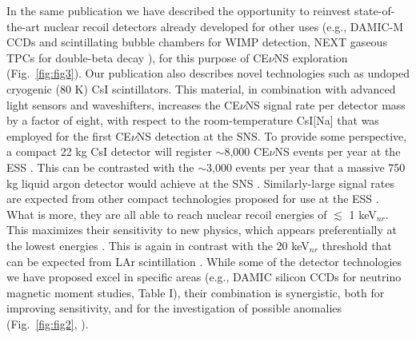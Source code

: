 \documentclass[12pt]{article}
\begin{document}
In the same publication we have described the opportunity to reinvest state-of-the-art nuclear recoil detectors already developed for other uses (e.g., DAMIC-M CCDs \cite{damic1,damic2,damic3,damic4} and scintillating bubble chambers \cite{eric} for WIMP detection, NEXT gaseous TPCs for double-beta decay \cite{next1,next2,next3}), for this purpose of CE$\nu$NS exploration (Fig.\ \ref{fig:fig3}). Our publication also describes novel technologies such as undoped cryogenic (80 K) CsI scintillators. This material, in combination with advanced light sensors and waveshifters, increases the CE$\nu$NS signal rate per detector mass by a factor of eight, with respect to the room-temperature CsI[Na] that was employed for the first CE$\nu$NS detection at the SNS. To provide some perspective, a compact 22 kg  CsI detector will register $\sim$8,000 CE$\nu$NS events per year at the ESS \cite{ESS}. This can be contrasted with the $\sim$3,000 events per year that a massive 750 kg liquid argon detector would achieve at the SNS \cite{tayloe}. Similarly-large signal rates are expected from other compact technologies proposed for use at the ESS \cite{ESS}. What is more, they are all able to reach nuclear recoil energies of $\lesssim$ 1 keV$_{nr}$. This maximizes their sensitivity to new physics, which appears preferentially at the lowest energies \cite{ESS}. This is again in contrast with the 20 keV$_{nr}$ threshold that can be expected from LAr scintillation \cite{tayloe,tayloe2}. While some of the detector technologies we have proposed excel in specific areas (e.g., DAMIC silicon CCDs for neutrino magnetic moment studies, Table I), their combination is synergistic, both for improving sensitivity, and for the investigation of possible anomalies (Fig.\ \ref{fig:fig2}, \cite{ESS}).   \\
\end{document}
